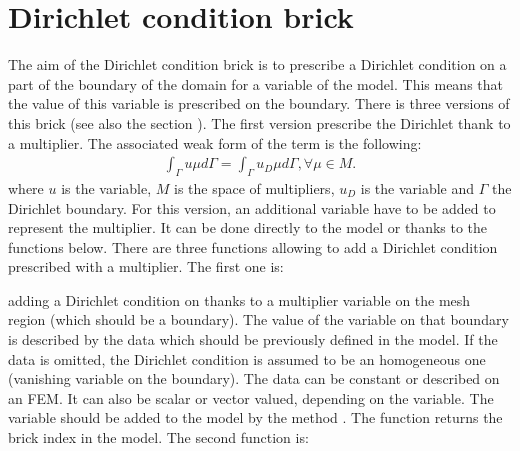 \documentclass[a4paper,11pt,english]{sphinxmanual}
\begin{document}
\section{Dirichlet condition brick}
\label{\detokenize{userdoc/model_dirichlet:dirichlet-condition-brick}}\label{\detokenize{userdoc/model_dirichlet:ud-model-dirichlet}}\label{\detokenize{userdoc/model_dirichlet:index-0}}\label{\detokenize{userdoc/model_dirichlet::doc}}
The aim of the Dirichlet condition brick is to prescribe a Dirichlet condition on
a part of the boundary of the domain for a variable of the model. This means that
the value of this variable is prescribed on the boundary. There is three versions of
this brick (see also the section {\hyperref[\detokenize{userdoc/model_Nitsche:ud-model-nitsche}]{}}). The first version prescribe the Dirichlet thank to a multiplier. The
associated weak form of the term is the following:
\begin{equation*}
\begin{split}\int_{\Gamma} u \mu d\Gamma = \int_{\Gamma} u_D \mu d\Gamma, \forall \mu \in M.\end{split}
\end{equation*}
where \(u\) is the variable, \(M\) is the space of multipliers, \(u_D\)
is the variable and \(\Gamma\) the Dirichlet boundary. For this version, an
additional variable have to be added to represent the multiplier. It can be done
directly to the model or thanks to the functions below. There are three functions
allowing to add a Dirichlet condition prescribed with a multiplier. The first one
is:

\begin{sphinxVerbatim}[commandchars=\\\{\}]
  
                                          
                                           
\end{sphinxVerbatim}

adding a Dirichlet condition on  thanks to a multiplier variable
 on the mesh region  (which should be a boundary). The value
of the variable on that boundary is described by the data  which
should be previously defined in the model. If the data is omitted, the Dirichlet
condition is assumed to be an homogeneous one (vanishing variable on the
boundary). The data can be constant or described on an FEM. It can also be scalar
or vector valued, depending on the variable. The variable  should be
added to the model by the method . The function returns the
brick index in the model. The second function is:
\end{document}
